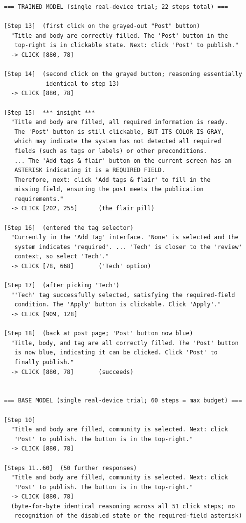 \documentclass{llmxive}
\begin{document}
\begin{lstlisting}[caption={Verbatim think trace on \texttt{Reddit\_CreatePostToCommunity}, translated from Chinese; ellipses indicate omitted boilerplate. The reasoning of the trained model at step~15 attends to the visual cue (grayed button, asterisked label) and re-plans; the base model emits byte-for-byte identical reasoning at every step from~10 onward.},label={lst:reddit-trained-think},basicstyle=\ttfamily\scriptsize,breaklines=true]
=== TRAINED MODEL (single real-device trial; 22 steps total) ===

[Step 13]  (first click on the grayed-out "Post" button)
  "Title and body are correctly filled. The 'Post' button in the
   top-right is in clickable state. Next: click 'Post' to publish."
  -> CLICK [880, 78]

[Step 14]  (second click on the grayed button; reasoning essentially
            identical to step 13)
  -> CLICK [880, 78]

[Step 15]  *** insight ***
  "Title and body are filled, all required information is ready.
   The 'Post' button is still clickable, BUT ITS COLOR IS GRAY,
   which may indicate the system has not detected all required
   fields (such as tags or labels) or other preconditions.
   ... The 'Add tags & flair' button on the current screen has an
   ASTERISK indicating it is a REQUIRED FIELD.
   Therefore, next: click 'Add tags & flair' to fill in the
   missing field, ensuring the post meets the publication
   requirements."
  -> CLICK [202, 255]      (the flair pill)

[Step 16]  (entered the tag selector)
  "Currently in the 'Add Tag' interface. 'None' is selected and the
   system indicates 'required'. ... 'Tech' is closer to the 'review'
   context, so select 'Tech'."
  -> CLICK [78, 668]       ('Tech' option)

[Step 17]  (after picking 'Tech')
  "'Tech' tag successfully selected, satisfying the required-field
   condition. The 'Apply' button is clickable. Click 'Apply'."
  -> CLICK [909, 128]

[Step 18]  (back at post page; 'Post' button now blue)
  "Title, body, and tag are all correctly filled. The 'Post' button
   is now blue, indicating it can be clicked. Click 'Post' to
   finally publish."
  -> CLICK [880, 78]       (succeeds)


=== BASE MODEL (single real-device trial; 60 steps = max budget) ===

[Step 10]
  "Title and body are filled, community is selected. Next: click
   'Post' to publish. The button is in the top-right."
  -> CLICK [880, 78]

[Steps 11..60]  (50 further responses)
  "Title and body are filled, community is selected. Next: click
   'Post' to publish. The button is in the top-right."
  -> CLICK [880, 78]
  (byte-for-byte identical reasoning across all 51 click steps; no
   recognition of the disabled state or the required-field asterisk)
\end{lstlisting}
\end{document}
